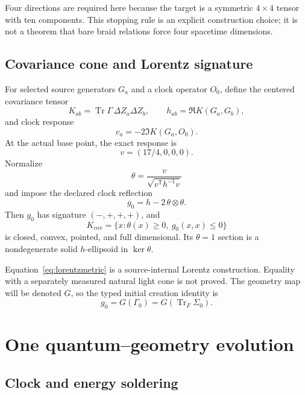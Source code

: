 \documentclass[11pt]{article}
\theoremstyle{definition}
\theoremstyle{remark}
\newcommand{\Tr}{\operatorname{Tr}}
\newcommand{\Ker}{\operatorname{ker}}
\begin{document}
Four directions are required here because the target is a symmetric $4\times4$ tensor with ten components. This stopping rule is an explicit construction choice; it is not a theorem that bare braid relations force four spacetime dimensions.

\subsection{Covariance cone and Lorentz signature}

For selected source generators $G_a$ and a clock operator $O_0$, define the centered covariance tensor
\begin{equation}
  K_{ab}=\Tr\Gamma\,\Delta Z_a\Delta Z_b,
  \qquad h_{ab}=\Re K(G_a,G_b),
\end{equation}
and clock response
\begin{equation}
  v_a=-2\Im K(G_a,O_0).
\end{equation}
At the actual base point, the exact response is
\begin{equation}
  v=(17/4,0,0,0).
\end{equation}
Normalize
\begin{equation}
  \theta=\frac{v}{\sqrt{v^{\mathsf T}h^{-1}v}}
\end{equation}
and impose the declared clock reflection
\begin{equation}\label{eq:lorentzmetric}
  g_0=h-2\,\theta\otimes\theta.
\end{equation}
Then $g_0$ has signature $(-,+,+,+)$, and
\begin{equation}
  K_{\mathrm{cov}}=\{x:\theta(x)\ge0,\ g_0(x,x)\le0\}
\end{equation}
is closed, convex, pointed, and full dimensional. Its $\theta=1$ section is a nondegenerate solid $h$-ellipsoid in $\Ker\theta$.

Equation~\eqref{eq:lorentzmetric} is a source-internal Lorentz construction. Equality with a separately measured natural light cone is not proved. The geometry map will be denoted $G$, so the typed initial creation identity is
\begin{equation}\label{eq:creation}
  g_0=G(\Gamma_0)=G(\Tr_F\Sigma_0).
\end{equation}

\section{One quantum--geometry evolution}

\subsection{Clock and energy soldering}
\end{document}
